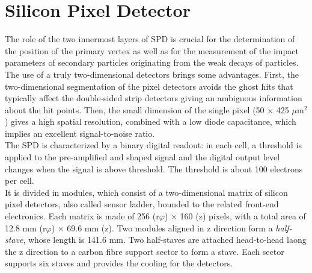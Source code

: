 \section{Silicon Pixel Detector}
The role of the two innermost layers of SPD is crucial for the determination of the position of the primary vertex as well as for the measurement of the impact parameters of secondary particles originating from the weak decays of particles. The use of a truly two-dimensional detectors brings some advantages. First, the two-dimensional segmentation of the pixel detectors avoids the ghost hits that typically affect the double-sided strip detectors giving an ambiguous information about the hit points. Then, the small dimension of the single pixel (50 $\times$ 425 $\mu$m$^2$) gives a high spatial resolution, combined with a low diode capacitance, which implies an excellent signal-to-noise ratio.\\
The SPD is characterized by a binary digital readout: in each cell, a threshold is applied to the pre-amplified and shaped signal and the digital output level changes when the signal is above threshold. The threshold is about 100 electrons per cell.\\
It is divided in modules, which consist of a two-dimensional matrix of silicon pixel detectors, also called sensor ladder, bounded to the related front-end electronics. Each matrix is made of 256 (r$\varphi$) $\times$ 160 (z) pixels, with a total area of 12.8 mm (r$\varphi$) $\times$ 69.6 mm (z). Two modules aligned in z direction form a \textit{half-stave}, whose length is 141.6 mm. Two half-staves are attached head-to-head laong the z direction to a carbon fibre support sector to form a stave. Each sector supports six staves and provides the cooling for the detectors.\\

